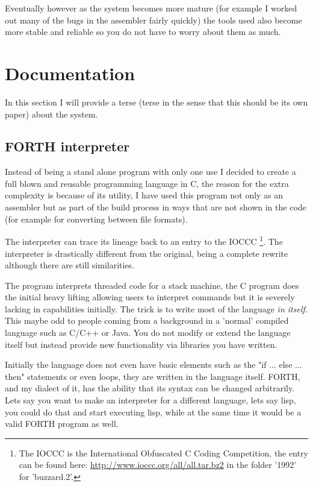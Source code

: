 \documentclass	[a4paper, 10pt]	{article}
\begin{document}
    Eventually however as the system becomes more mature (for example I worked out
    many of the bugs in the assembler fairly quickly) the tools used also become
    more stable and reliable so you do not have to worry about them as much.

  \section{Documentation}

  In this section I will provide a terse (terse in the sense that this should
  be its own paper) about the system.

    \subsection{FORTH interpreter}

    Instead of being a stand alone program with only one use I decided to create
    a full blown and reusable programming language in C, the reason for the extra
    complexity is because of its utility, I have used this program not only as an
    assembler but as part of the build process in ways that are not shown in the
    code (for example for converting between file formats).

    The interpreter can trace its lineage back to an entry to the IOCCC \footnote{
    The IOCCC is the International Obfuscated C Coding Competition, the entry can
    be found here: \url{http://www.ioccc.org/all/all.tar.bz2} in the folder '1992'
    for 'buzzard.2'.}. The interpreter is drastically different from the original,
    being a complete rewrite although there are still similarities. 

    The program interprets threaded code \cite{threadedCode} for a stack machine,
    the C program does the initial heavy lifting allowing users to interpret commands
    but it is severely lacking in capabilities initially. The trick is to write most
    of the language \emph{in itself}. This maybe odd to people coming from a background
    in a 'normal' compiled language such as C/C++ or Java. You do not modify or extend
    the language itself but instead provide new functionality via libraries you have
    written.

    Initially the language does not even have basic elements such as the "if ... else ... then"
    statements or even loops, they are written in the language itself. FORTH, and my
    dialect of it, has the ability that its syntax can be changed arbitrarily. Lets say
    you want to make an interpreter for a different language, lets say lisp, you could
    do that and start executing lisp, while at the same time it would be a valid FORTH
    program as well.
\end{document}
